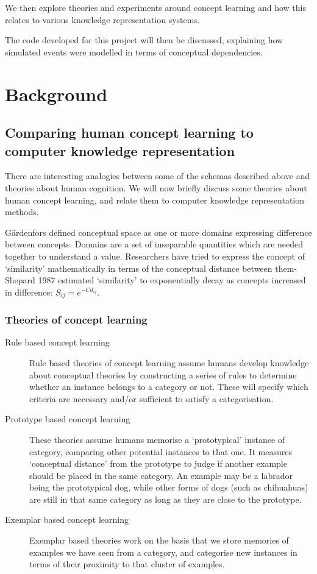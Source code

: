 \documentclass[12pt,MSc,wordcount,twoside]{muthesis}
\begin{document}
    We then explore theories and experiments around concept learning and how this relates to various knowledge representation systems.

    The code developed for this project will then be discussed, explaining how simulated events were modelled in terms of conceptual dependencies. 

    \chapter{Background}
    


    \section{Comparing human concept learning to computer knowledge representation}
    There are interesting analogies between some of the schemas described above and theories about human cognition. We will now briefly discuss some theories about human concept learning, and relate them to computer knowledge representation methods. 

    G{\"a}rdenfors \cite{gardenfors2004conceptual} defined conceptual space as one or more domains expressing difference between concepts. Domains are a set of inseparable quantities which are needed together to understand a value. Researchers have tried to express the concept of `similarity' mathematically in terms of the conceptual distance between them- Shepard 1987 \cite{shepard1987toward} estimated `similarity' to exponentially decay as concepts increased in difference: \(S_{ij}=e^{-Cd_{ij}}\).

    \subsection{Theories of concept learning}
    \begin{description}
        \item[Rule based concept learning] Rule based theories of concept learning assume humans develop knowledge about conceptual theories by constructing a series of rules to determine whether an instance belongs to a category or not. These will specify which criteria are necessary and/or sufficient to satisfy a categorisation.\cite{rouder2006comparing}
        \item[Prototype based concept learning] These theories assume humans memorise a `prototypical' instance of category, comparing other potential instances to that one.\cite{griffiths2007unifying} It measures `conceptual distance' from the prototype to judge if another example should be placed in the same category. An example may be a labrador being the prototypical dog, while other forms of dogs (such as chihuahuas) are still in that same category as long as they are close to the prototype.
        \item[Exemplar based concept learning] Exemplar based theories work on the basis that we store memories of examples we have seen from a category, and categorise new instances in terms of their proximity to that cluster of examples.\cite{griffiths2007unifying}
    \end{description}
\end{document}
